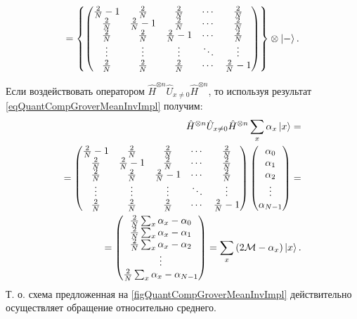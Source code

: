 \begin{eqnarray}
=
\left\{
\begin{pmatrix}
\frac{2}{N} - 1  & \frac{2}{N} & \frac{2}{N} & \cdots & \frac{2}{N} \\
\frac{2}{N} & \frac{2}{N} - 1 & \frac{2}{N} & \cdots & \frac{2}{N} \\
\frac{2}{N} & \frac{2}{N} & \frac{2}{N} - 1 & \cdots & \frac{2}{N} \\
\vdots & \vdots & \vdots & \ddots & \vdots \\
\frac{2}{N} & \frac{2}{N} & \frac{2}{N} & \cdots & \frac{2}{N} - 1\\
\end{pmatrix}
\right\}
\otimes \ket{-}.
\label{eqQuantCompGroverMeanInvImpl}
\end{eqnarray}

Если воздействовать оператором $\hat{H}^{\otimes n}\hat{U}_{x \ne
  0}\hat{H}^{\otimes n}$, то используя результат
\eqref{eqQuantCompGroverMeanInvImpl} получим:
\begin{eqnarray}
\hat{H}^{\otimes n}\hat{U}_{x \ne
  0}\hat{H}^{\otimes n} \sum_x \alpha_x \ket{ x } = 
\nonumber \\
=
\begin{pmatrix}
\frac{2}{N} - 1  & \frac{2}{N} & \frac{2}{N} & \cdots & \frac{2}{N} \\
\frac{2}{N} & \frac{2}{N} - 1 & \frac{2}{N} & \cdots & \frac{2}{N} \\
\frac{2}{N} & \frac{2}{N} & \frac{2}{N} - 1 & \cdots & \frac{2}{N} \\
\vdots & \vdots & \vdots & \ddots & \vdots \\
\frac{2}{N} & \frac{2}{N} & \frac{2}{N} & \cdots & \frac{2}{N} - 1\\
\end{pmatrix}
\begin{pmatrix}
\alpha_0 \\
\alpha_1 \\
\alpha_2 \\
\vdots \\
\alpha_{N - 1} \\
\end{pmatrix}
=
\nonumber \\
=
\begin{pmatrix}
\frac{2}{N}\sum_x\alpha_x - \alpha_0\\
\frac{2}{N}\sum_x\alpha_x - \alpha_1\\
\frac{2}{N}\sum_x\alpha_x - \alpha_2\\
\vdots \\
\frac{2}{N}\sum_x\alpha_x - \alpha_{N-1}\\
\end{pmatrix} = 
\sum_x \left(2 \mathcal{M} - \alpha_x \right)\ket{ x }.
\nonumber
\end{eqnarray}
Т. о. схема предложенная на \autoref{figQuantCompGroverMeanInvImpl}
действительно осуществляет обращение относительно среднего.
